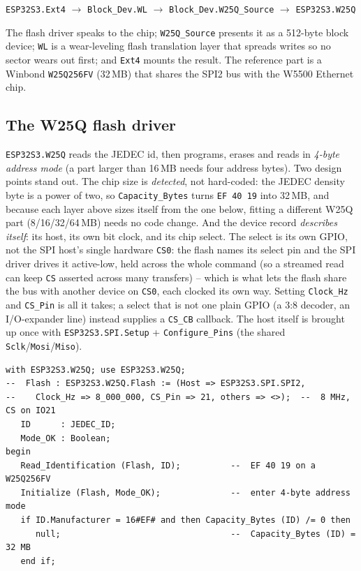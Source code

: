 \begin{center}
\texttt{ESP32S3.Ext4} $\rightarrow$ \texttt{Block\_Dev.WL} $\rightarrow$
\texttt{Block\_Dev.W25Q\_Source} $\rightarrow$ \texttt{ESP32S3.W25Q}
\end{center}

\noindent The flash driver speaks to the chip; \texttt{W25Q\_Source} presents it
as a 512-byte block device; \texttt{WL} is a wear-leveling flash translation
layer that spreads writes so no sector wears out first; and \texttt{Ext4} mounts
the result. The reference part is a Winbond \texttt{W25Q256FV} (32\,MB) that shares
the SPI2 bus with the W5500 Ethernet chip.

\subsection{The W25Q flash driver}

\texttt{ESP32S3.W25Q} reads the JEDEC id, then programs, erases and reads in
\emph{4-byte address mode} (a part larger than 16\,MB needs four address bytes).
Two design points stand out. The chip size is \emph{detected}, not hard-coded: the
JEDEC density byte is a power of two, so \texttt{Capacity\_Bytes} turns
\texttt{EF\,40\,19} into 32\,MB, and because each layer above sizes itself from the
one below, fitting a different W25Q part (8/16/32/64\,MB) needs no code change.
And the device record \emph{describes itself}: its host, its own bit clock, and its
chip select. The select is its own GPIO, not the SPI host's single hardware
\texttt{CS0}: the flash names its select pin and the SPI driver drives it
active-low, held across the whole command (so a streamed read can keep \texttt{CS}
asserted across many transfers) -- which is what lets the flash share the bus
with another device on \texttt{CS0}, each clocked its own way. Setting
\texttt{Clock\_Hz} and \texttt{CS\_Pin} is all it takes; a select that is not one
plain GPIO (a 3:8 decoder, an I/O-expander line) instead supplies a \texttt{CS\_CB}
callback. The host itself is brought up once with \texttt{ESP32S3.SPI.Setup} +
\texttt{Configure\_Pins} (the shared \texttt{Sclk}/\texttt{Mosi}/\texttt{Miso}).

\begin{lstlisting}
with ESP32S3.W25Q; use ESP32S3.W25Q;
--  Flash : ESP32S3.W25Q.Flash := (Host => ESP32S3.SPI.SPI2,
--    Clock_Hz => 8_000_000, CS_Pin => 21, others => <>);  --  8 MHz, CS on IO21
   ID      : JEDEC_ID;
   Mode_OK : Boolean;
begin
   Read_Identification (Flash, ID);          --  EF 40 19 on a W25Q256FV
   Initialize (Flash, Mode_OK);              --  enter 4-byte address mode
   if ID.Manufacturer = 16#EF# and then Capacity_Bytes (ID) /= 0 then
      null;                                  --  Capacity_Bytes (ID) = 32 MB
   end if;
\end{lstlisting}

